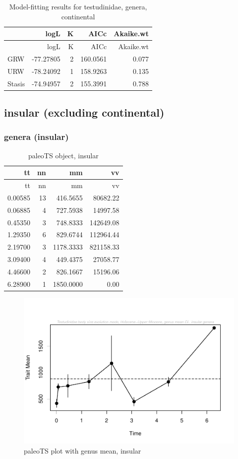 \documentclass[]{article}
\begin{document}
\begin{longtable}[]{@{}lrrrr@{}}
\caption{Model-fitting results for testudinidae, genera,
continental}\tabularnewline
\toprule
& logL & K & AICc & Akaike.wt\tabularnewline
\midrule
\endfirsthead
\toprule
& logL & K & AICc & Akaike.wt\tabularnewline
\midrule
\endhead
GRW & -77.27805 & 2 & 160.0561 & 0.077\tabularnewline
URW & -78.24092 & 1 & 158.9263 & 0.135\tabularnewline
Stasis & -74.94957 & 2 & 155.3991 & 0.788\tabularnewline
\bottomrule
\end{longtable}

\newpage

\subsection{insular (excluding
continental)}\label{insular-excluding-continental}

\subsubsection{genera (insular)}\label{genera-insular}

\begin{longtable}[]{@{}rrrr@{}}
\caption{paleoTS object, insular}\tabularnewline
\toprule
tt & nn & mm & vv\tabularnewline
\midrule
\endfirsthead
\toprule
tt & nn & mm & vv\tabularnewline
\midrule
\endhead
0.00585 & 13 & 416.5655 & 80682.22\tabularnewline
0.06885 & 4 & 727.5938 & 14997.58\tabularnewline
0.45350 & 3 & 748.8333 & 142649.08\tabularnewline
1.29350 & 6 & 829.6744 & 112964.44\tabularnewline
2.19700 & 3 & 1178.3333 & 821158.33\tabularnewline
3.09400 & 4 & 449.4375 & 27058.77\tabularnewline
4.46600 & 2 & 826.1667 & 15196.06\tabularnewline
6.28900 & 1 & 1850.0000 & 0.00\tabularnewline
\bottomrule
\end{longtable}

\begin{figure}[htbp]
\centering
\includegraphics{MA_JJ_files/figure-latex/paleoTSI-1.pdf}
\caption{paleoTS plot with genus mean, insular}
\end{figure}
\end{document}
